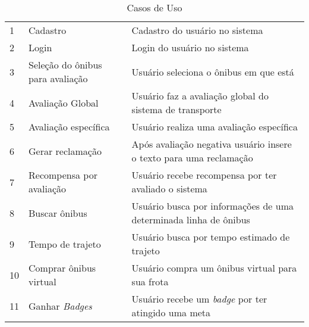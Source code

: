 \begin{table}[H]
	\caption {Casos de Uso}
	\label{tab:casosDeUso}
    \begin{tabular}{lll}
      \toprule

     	\headerCell{Nº} & \headerCell{Caso de Uso} & \headerCell{Descrição} \\

	    \midrule
	    
	    1  & Cadastro 								& Cadastro do usuário no sistema \\
	 	2  & Login 	  								& Login do usuário no sistema \\
	    3  & Seleção do ônibus	para avaliação		& Usuário seleciona o ônibus em que está \\
	    4  & Avaliação Global						& \begin{minipage}{0.5\textwidth}\espacoVert Usuário faz a avaliação global do sistema de transporte \espacoVert \end{minipage}\\
	    5  & Avaliação específica					& Usuário realiza uma avaliação específica \\
	    6  & Gerar reclamação						& \begin{minipage}{0.5\textwidth}\espacoVert Após avaliação negativa usuário insere o texto para uma reclamação \espacoVert \end{minipage} \\
	    7  & Recompensa por avaliação 				& \begin{minipage}{0.5\textwidth}\espacoVert Usuário recebe recompensa por ter avaliado o sistema \espacoVert \end{minipage} \\
	    8  & Buscar ônibus							& \begin{minipage}{0.5\textwidth}\espacoVert Usuário busca por informações de uma determinada linha de ônibus \espacoVert \end{minipage} \\
	    9  & Tempo de trajeto						& Usuário busca por tempo estimado de trajeto \\
	    10 & Comprar ônibus virtual				& Usuário compra um ônibus virtual para sua frota \\
		11 & Ganhar \textit{Badges}					& Usuário recebe um \textit{badge} por ter atingido uma meta \\
	        
	    \bottomrule
    \end{tabular}
\end{table}
